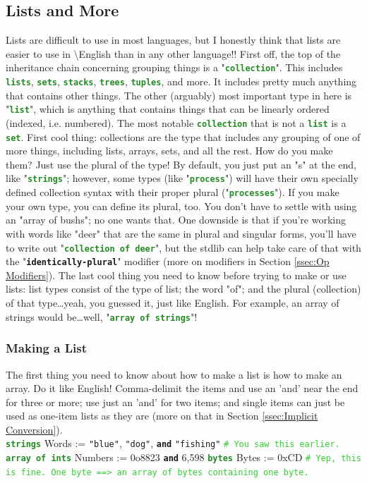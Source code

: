 \documentclass{article}
\newcommand{\English}{\textbackslash{}English}				%
\newcommand{\ssecl}[1]{\subsection{#1}\label{ssec:#1}}
\newcommand{\sssecl}[1]{\subsubsection{#1}\label{sssec:#1}}
\newcommand{\codecomment}[1]{\texttt{\textcolor{LimeGreen}{#1}}}
\newcommand{\commentline}[1]{\codecomment{\# #1}}
\newcommand{\type}[1]{\texttt{\textcolor{ForestGreen}{\textbf{#1}}}}
\newcommand{\common}[1]{\texttt{\textcolor{Mulberry}{\textbf{#1}}}}
\newcommand{\codestring}[1]{\texttt{\textcolor{NavyBlue}{"#1"}}}
\newenvironment{code}[0]
{\ttfamily{}				%
\setlength\parindent{0cm}	%
~\\}
{\setlength\parindent{1cm}
~\\}
\begin{document}
\ssecl{Lists and More}
\indent Lists are difficult to use in most languages, but I honestly think that lists are easier to use in \English{} than in any other language!!
\indent First off, the top of the inheritance chain concerning grouping things is a "\type{collection}". This includes \type{lists}, \type{sets}, \type{stacks}, \type{trees}, \type{tuples}, and more. It includes pretty much anything that contains other things. The other (arguably) most important type in here is "\type{list}", which is anything that contains things that can be linearly ordered (indexed, i.e. numbered). The most notable \type{collection} that is not a \type{list} is a \type{set}.
\indent First cool thing: collections are the type that includes any grouping of one of more things, including lists, arrays, sets, and all the rest. How do you make them? Just use the plural of the type! By default, you just put an "s" at the end, like "\type{strings}"; however, some types (like "\type{process}") will have their own specially defined collection syntax with their proper plural ("\type{processes}"). If you make your own type, you can define its plural, too. You don't have to settle with using an "array of bushs"; no one wants that. One downside is that if you're working with words like "deer" that are the same in plural and singular forms, you'll have to write out "\type{collection of deer}", but the stdlib can help take care of that with the "\common{identically-plural}" modifier (more on modifiers in Section \ref{ssec:Op Modifiers}).
\indent The last cool thing you need to know before trying to make or use lists: list types consist of the type of list; the word "of"; and the plural (collection) of that type\ldots yeah, you guessed it, just like English. For example, an array of strings would be\ldots well, "\type{array of strings}"!

\sssecl{Making a List}
\indent The first thing you need to know about how to make a list is how to make an array. Do it like English! Comma-delimit the items and use an 'and' near the end for three or more; use just an 'and' for two items; and single items can just be used as one-item lists as they are (more on that in Section \ref{ssec:Implicit Conversion}).
\begin{code}
\type{strings} Words := \codestring{blue}, \codestring{dog}, \common{and} \codestring{fishing} \commentline{You saw this earlier.}
\type{array of ints} Numbers := 0o8823 \common{and} 6,598
\type{bytes} Bytes := 0xCD \commentline{Yep, this is fine. One byte ==> an array of bytes containing one byte.}
\end{code}
\end{document}

